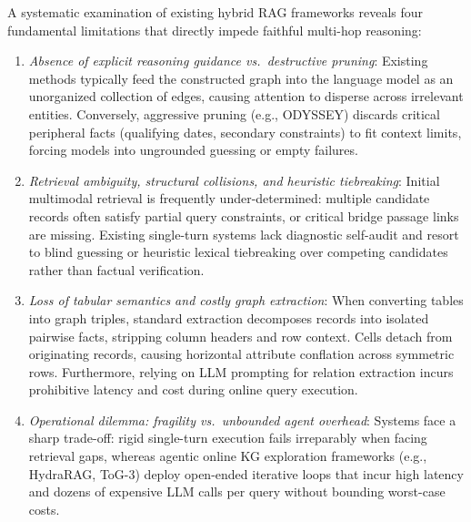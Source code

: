 \documentclass[runningheads]{llncs}
\begin{document}
A systematic examination of existing hybrid RAG frameworks reveals four fundamental limitations that directly impede faithful multi-hop reasoning:
\begin{enumerate}
    \item \emph{Absence of explicit reasoning guidance vs.\ destructive pruning}: Existing methods typically feed the constructed graph into the language model as an unorganized collection of edges, causing attention to disperse across irrelevant entities. Conversely, aggressive pruning (e.g., ODYSSEY) discards critical peripheral facts (qualifying dates, secondary constraints) to fit context limits, forcing models into ungrounded guessing or empty failures.
    \item \emph{Retrieval ambiguity, structural collisions, and heuristic tiebreaking}: Initial multimodal retrieval is frequently under-determined: multiple candidate records often satisfy partial query constraints, or critical bridge passage links are missing. Existing single-turn systems lack diagnostic self-audit and resort to blind guessing or heuristic lexical tiebreaking over competing candidates rather than factual verification.
    \item \emph{Loss of tabular semantics and costly graph extraction}: When converting tables into graph triples, standard extraction decomposes records into isolated pairwise facts, stripping column headers and row context. Cells detach from originating records, causing horizontal attribute conflation across symmetric rows. Furthermore, relying on LLM prompting for relation extraction incurs prohibitive latency and cost during online query execution.
    \item \emph{Operational dilemma: fragility vs.\ unbounded agent overhead}: Systems face a sharp trade-off: rigid single-turn execution fails irreparably when facing retrieval gaps, whereas agentic online KG exploration frameworks (e.g., HydraRAG, ToG-3) deploy open-ended iterative loops that incur high latency and dozens of expensive LLM calls per query without bounding worst-case costs.
\end{enumerate}
\end{document}
